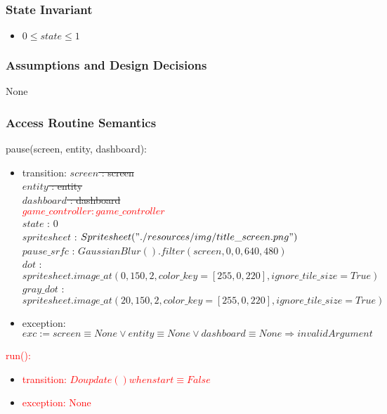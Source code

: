 \documentclass[12pt]{article}
\begin{document}
\subsubsection* {State Invariant}

\begin{itemize}
    \item $0 \leq state \leq 1$
\end{itemize}

\subsubsection* {Assumptions and Design Decisions}

None

\subsubsection* {Access Routine Semantics}

\noindent pause(screen, entity, dashboard):
\begin{itemize}
    \item transition: 
    \sout{$screen$ : screen} \\
    \sout{$entity$ : entity} \\
    \sout{$dashboard$ : dashboard}\\
    \textcolor{red}{$game\_controller : game\_controller$} \\
    $state$ : 0 \\
    $spritesheet$ : $Spritesheet("./resources/img/title\_screen.png")$ \\
    $pause\_srfc$ : $GaussianBlur().filter(screen, 0, 0, 640, 480)$ \\
    $dot$ : $spritesheet.image\_at(0, 150, 2, color\_key=[255, 0, 220], ignore\_tile\_size=True)$ \\
    $gray\_dot$ : $spritesheet.image\_at(20, 150, 2, color\_key=[255, 0, 220], ignore\_tile\_size=True)$ \\
    
    \item exception: $exc := screen \equiv None \lor entity \equiv None \lor dashboard \equiv None \Rightarrow invalidArgument$
\end{itemize}

\noindent \textcolor{red}{run():}
\begin{itemize}
    \item \textcolor{red}{transition: $Do update() when start \equiv False$}
    \item \textcolor{red}{exception: None}
\end{itemize}
\end{document}
